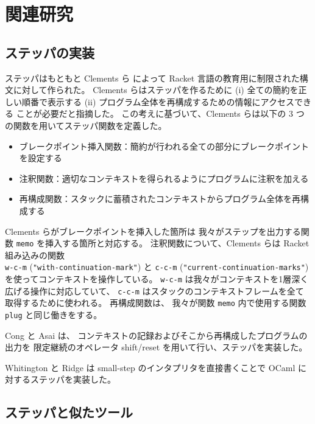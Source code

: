 \chapter{関連研究}
\label{chapter:related}

\section{ステッパの実装}
\label{section:stepper__related}

ステッパはもともと Clements ら \cite{clements01} によって
Racket 言語の教育用に制限された構文に対して作られた。
Clements らはステッパを作るために
(i) 全ての簡約を正しい順番で表示する
(ii) プログラム全体を再構成するための情報にアクセスできる
ことが必要だと指摘した。
この考えに基づいて、Clements らは以下の 3 つの関数を用いてステッパ関数を定義した。
\begin{itemize}
\item ブレークポイント挿入関数：簡約が行われる全ての部分にブレークポイントを設定する
\item 注釈関数：適切なコンテキストを得られるようにプログラムに注釈を加える
\item 再構成関数：スタックに蓄積されたコンテキストからプログラム全体を再構成する
\end{itemize}
Clements らがブレークポイントを挿入した箇所は
我々がステップを出力する関数 \texttt{memo} を挿入する箇所と対応する。
注釈関数について、Clements らは Racket 組み込みの関数\\
\texttt{w-c-m} (\texttt{"with-continuation-mark"}) と
\texttt{c-c-m} (\texttt{"current-continuation-marks"})
を使ってコンテキストを操作している。
\texttt{w-c-m} は我々がコンテキストを1層深く広げる操作に対応していて、
\texttt{c-c-m} はスタックのコンテキストフレームを全て取得するために使われる。
再構成関数は、
我々が関数 \texttt{memo} 内で使用する関数 \texttt{plug} と同じ働きをする。

Cong と Asai \cite{Cong16} は、
コンテキストの記録およびそこから再構成したプログラムの出力を
限定継続のオペレータ shift/reset を用いて行い、ステッパを実装した。

Whitington と Ridge \cite{EPTCS294.3} は
small-step のインタプリタを直接書くことで
OCaml に対するステッパを実装した。

\section{ステッパと似たツール}

